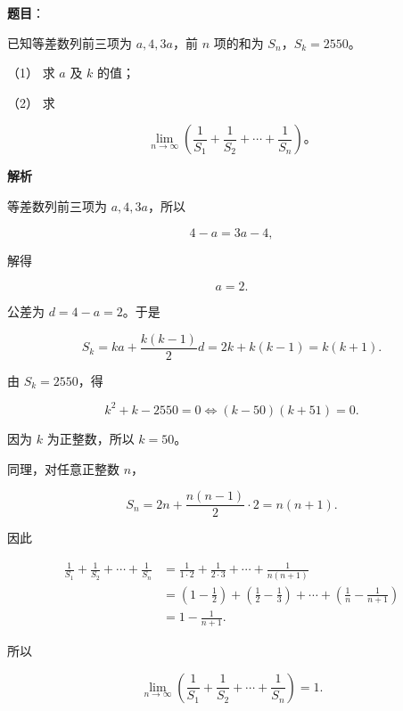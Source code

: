 \begin{answer}

\textbf{题目}：

已知等差数列前三项为 $a,4,3a$，前 $n$ 项的和为 $S_n$，$S_k=2550$。

（1） 求 $a$ 及 $k$ 的值；

（2） 求

\nopagebreak[4]
\[
\lim_{n\to\infty}\left(\frac1{S_1}+\frac1{S_2}+\cdots+\frac1{S_n}\right)。
\]

\textbf{解析}


等差数列前三项为 $a,4,3a$，所以

\nopagebreak[4]
\[
4-a=3a-4,
\]

解得

\nopagebreak[4]
\[
a=2.
\]

公差为 $d=4-a=2$。于是

\nopagebreak[4]
\[
S_k=ka+\frac{k(k-1)}2d
=2k+k(k-1)=k(k+1).
\]

由 $S_k=2550$，得

\nopagebreak[4]
\[
k^2+k-2550=0
\Longleftrightarrow (k-50)(k+51)=0.
\]

因为 $k$ 为正整数，所以 $k=50$。


同理，对任意正整数 $n$，

\nopagebreak[4]
\[
S_n=2n+\frac{n(n-1)}2\cdot2=n(n+1).
\]

因此

\nopagebreak[4]
\[
\begin{aligned}
\frac1{S_1}+\frac1{S_2}+\cdots+\frac1{S_n}
&=\frac1{1\cdot2}+\frac1{2\cdot3}+\cdots+\frac1{n(n+1)}\\
&=\left(1-\frac12\right)+\left(\frac12-\frac13\right)
+\cdots+\left(\frac1n-\frac1{n+1}\right)\\
&=1-\frac1{n+1}.
\end{aligned}
\]

所以

\nopagebreak[4]
\[
\lim_{n\to\infty}\left(\frac1{S_1}+\frac1{S_2}+\cdots+\frac1{S_n}\right)=1.
\]



\end{answer}
